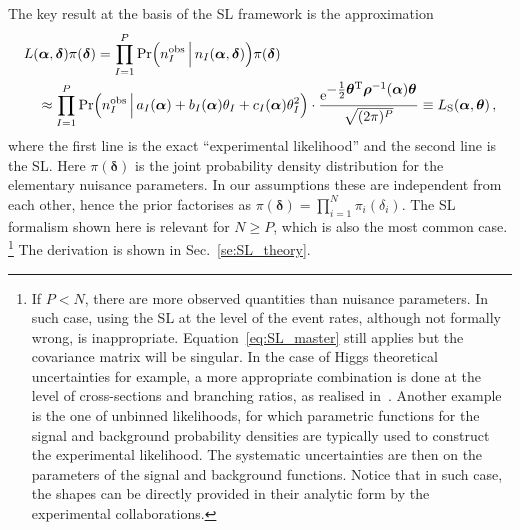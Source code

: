 \documentclass[11pt]{article}
\begin{document}
The key result at the basis of  the SL framework is the approximation
\begin{align}
  & L(\bm{\alpha},\bm{\delta} )\pi(\bm{\delta})
   = \prod_{I=1}^P \mathrm{Pr}\Big(  n^{\rm obs}_I\,\Big|\,n_I(\bm{\alpha},\bm{\delta})  \Big) \pi(\bm{\delta}) \label{eq:EL} \\
  & \quad \approx \prod_{I=1}^P \mathrm{Pr}\Big( n^{\rm obs}_I\,\Big|\,a_{I}(\bm \alpha)+b_I(\bm \alpha)\theta_I+c_I(\bm \alpha)\theta_I^2  \Big) \cdot
    \frac{ \mathrm{e}^{{\textstyle-\frac{1}{2}\bm \theta^{\rm T} \bm{\rho}^{-1}(\bm \alpha) \bm \theta}}}{\sqrt{(2\pi)^P }}  \equiv L_{\rm{S}}(\bm{\alpha},\bm{\theta})\,, \label{eq:SL_master}
\end{align}
where the first line is the exact ``experimental likelihood'' and the second line is the SL. Here $\pi(\bm \delta)$ is the joint probability density distribution for the elementary nuisance parameters. In our assumptions  these are independent from each other, hence the prior factorises as $\pi(\bm \delta)=\prod_{i=1}^N \pi_i(\delta_i)$. The SL formalism shown here is relevant for $N\geq P$, which is also the most common case.%
%
\footnote{If $P<N$, there are more observed quantities than nuisance parameters.
 In such case, using the SL at the level of the event rates, although not formally wrong, is inappropriate.
  Equation~\eqref{eq:SL_master} still applies but the covariance matrix will be singular. In the case of Higgs theoretical uncertainties for example, a more appropriate combination is done at the level of cross-sections and branching ratios, as realised in~\cite{Arbey:2016kqi}. Another example is the one of unbinned likelihoods, for which parametric functions for the signal and background probability densities
are typically used to construct the experimental likelihood. The systematic uncertainties are then on the parameters of the signal and background functions. 
Notice that in such case, the shapes can be directly provided in their analytic form by the experimental collaborations.}
% 
The derivation is shown in Sec.~\ref{se:SL_theory}.
\end{document}

